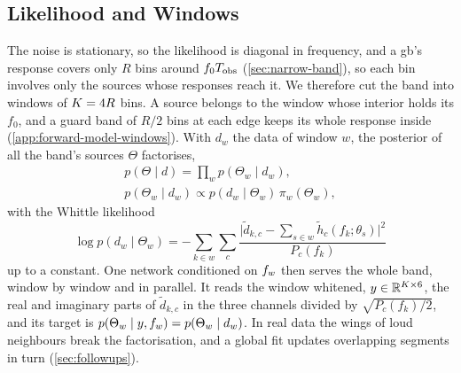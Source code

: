 \subsection{Likelihood and Windows}
\label{sec:gw-slicing}\label{sec:gw-factorisation}\label{sec:gw-windows}

The noise is stationary, so the likelihood is diagonal in frequency, and a \ac{gb}'s response covers
only $R$ bins around $f_0T_{\rm obs}$ (\cref{sec:narrow-band}), so each bin involves only the sources whose
responses reach it. We therefore cut the band into windows of $K = 4{}R$
bins. A source belongs to the window whose interior holds its $f_0$, and a guard band of $R/2$ bins
at each edge keeps its whole response inside (\cref{app:forward-model-windows}). With $d_w$ the data
of window $w$, the posterior of all the band's sources $\Theta$ factorises,
\begin{equation}
\begin{gathered}
  p(\Theta\mid d) = \textstyle\prod_{w} p(\Theta_w\mid d_w),\\
  p(\Theta_w\mid d_w) \propto p(d_w\mid\Theta_w)\,\pi_w(\Theta_w),
\end{gathered}
  \label{eq:gw-factorisation}
\end{equation}
with the Whittle likelihood
\begin{equation}
  \log p(d_w\mid\Theta_w) = -\sum_{k\in w}\sum_{c}\frac{\bigl|\tilde d_{k,c}-\sum_{s\in w}\tilde h_c(f_k;\theta_s)\bigr|^2}{P_c(f_k)}
  \label{eq:loglik}
\end{equation}
up to a constant. One network conditioned on $f_{w}$ then serves the whole band, window by window and in
parallel. It reads the window whitened, $y\in\mathbb{R}^{K\times6}$, the real and imaginary parts of
$\tilde d_{k,c}$ in the three channels divided by $\sqrt{P_c(f_k)/2}$, and its target is
$p(\Theta_w\mid y,f_{w}) = p(\Theta_w\mid d_w)$. In real data the wings of loud neighbours break the
factorisation, and a global fit updates overlapping segments in turn \citep{littenberg2020global}
(\cref{sec:followups}).
